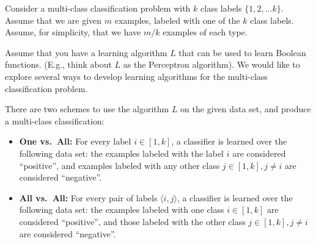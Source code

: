 \documentclass[11pt]{article}
\begin{document}
Consider a multi-class classification problem with $k$ class
labels $\{1, 2, \ldots k\}$. Assume that we are given $m$
examples, labeled with one of the $k$ class labels. Assume, for
simplicity, that we have $m/k$ examples of each type.

Assume that you have a learning algorithm $L$ that can be used
to learn Boolean functions. (E.g., think about $L$ as the
Perceptron algorithm). We would like to explore several ways to
develop learning algorithms for the multi-class classification
problem.

There are two schemes to use the algorithm $L$ on the given data set, and produce a multi-class classification:
\begin{itemize}
\item {\bf One vs.~All:} For every label $i \in [1,k]$, a classifier is learned over the following data set: the examples labeled with the label $i$ are considered ``positive'', and examples labeled with any other class $j \in [1,k], j \neq i$ are considered ``negative''.
\item {\bf All vs.~All:} For every pair of labels $\langle i, j \rangle$, a classifier is learned over the following data set: the examples labeled with one class $i \in [1,k]$ are considered ``positive'', and those labeled with the other class $j \in [1,k], j \neq i$ are considered ``negative''.
\end{itemize}
%
\vspace{-3mm}
\end{document}
